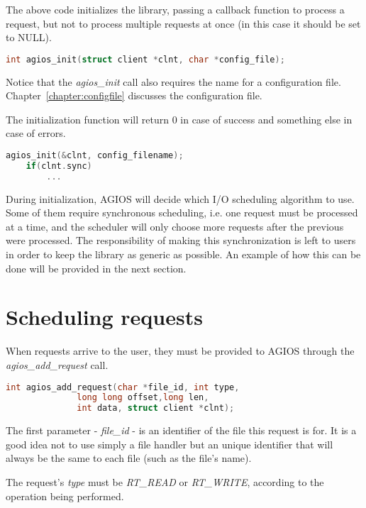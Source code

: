 The above code initializes the library, passing a callback function to process a request, but not to process multiple requests at once (in this case it should be set to NULL). 

\begin{lstlisting}[language=C]
int agios_init(struct client *clnt, char *config_file);
\end{lstlisting}

Notice that the \emph{agios\_init} call also requires the name for a configuration file. Chapter~\ref{chapter:configfile} discusses the configuration file.

The initialization function will return $0$ in case of success and something else in case of errors.

\begin{lstlisting}[language=C]
	agios_init(&clnt, config_filename);
	if(clnt.sync)
		...
\end{lstlisting}

During initialization, AGIOS will decide which I/O scheduling algorithm to use. Some of them require synchronous scheduling, i.e. one request must be processed at a time, and the scheduler will only choose more requests after the previous were processed. The responsibility of making this synchronization is left to users in order to keep the library as generic as possible. An example of how this can be done will be provided in the next section.

\section{Scheduling requests}

When requests arrive to the user, they must be provided to AGIOS through the \emph{agios\_add\_request} call.

\begin{lstlisting}[language=C]
int agios_add_request(char *file_id, int type, 
		      long long offset,long len, 
		      int data, struct client *clnt);
\end{lstlisting}

The first parameter - \emph{file\_id} - is an identifier of the file this request is for. It is a good idea not to use simply a file handler but an unique identifier that will always be the same to each file (such as the file's name). 

The request's \emph{type} must be \emph{RT\_READ} or \emph{RT\_WRITE}, according to the operation being performed.

